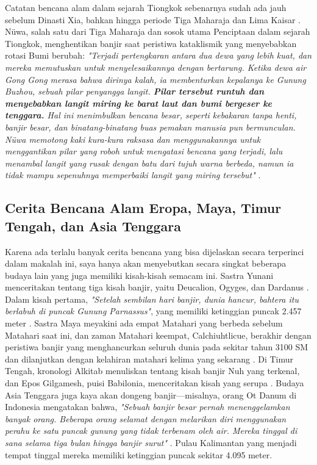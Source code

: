 \documentclass[10pt,twocolumn,letterpaper]{article}
\begin{document}
Catatan bencana alam dalam sejarah Tiongkok sebenarnya sudah ada jauh sebelum Dinasti Xia, bahkan hingga periode Tiga Maharaja dan Lima Kaisar \cite{7}. Nüwa, salah satu dari Tiga Maharaja dan sosok utama Penciptaan dalam sejarah Tiongkok, menghentikan banjir saat peristiwa kataklismik yang menyebabkan rotasi Bumi berubah: \textit{"Terjadi pertengkaran antara dua dewa yang lebih kuat, dan mereka memutuskan untuk menyelesaikannya dengan bertarung. Ketika dewa air Gong Gong merasa bahwa dirinya kalah, ia membenturkan kepalanya ke Gunung Buzhou, sebuah pilar penyangga langit. \textbf{Pilar tersebut runtuh dan menyebabkan langit miring ke barat laut dan bumi bergeser ke tenggara.} Hal ini menimbulkan bencana besar, seperti kebakaran tanpa henti, banjir besar, dan binatang-binatang buas pemakan manusia pun bermunculan. Nüwa memotong kaki kura-kura raksasa dan menggunakannya untuk menggantikan pilar yang roboh untuk mengatasi bencana yang terjadi, lalu menambal langit yang rusak dengan batu dari tujuh warna berbeda, namun ia tidak mampu sepenuhnya memperbaiki langit yang miring tersebut"} \cite{8}.

\subsection{Cerita Bencana Alam Eropa, Maya, Timur Tengah, dan Asia Tenggara}

Karena ada terlalu banyak cerita bencana yang bisa dijelaskan secara terperinci dalam makalah ini, saya hanya akan menyebutkan secara singkat beberapa budaya lain yang juga memiliki kisah-kisah semacam ini. Sastra Yunani menceritakan tentang tiga kisah banjir, yaitu Deucalion, Ogyges, dan Dardanus \cite{9,10}. Dalam kisah pertama, \textit{"Setelah sembilan hari banjir, dunia hancur, bahtera itu berlabuh di puncak Gunung Parnassus"}, yang memiliki ketinggian puncak 2.457 meter \cite{11}. Sastra Maya meyakini ada empat Matahari yang berbeda sebelum Matahari saat ini, dan zaman Matahari keempat, Calchiuhtlicue, berakhir dengan peristiwa banjir yang menghancurkan seluruh dunia pada sekitar tahun 3100 SM dan dilanjutkan dengan kelahiran matahari kelima yang sekarang \cite{12}. Di Timur Tengah, kronologi Alkitab menuliskan tentang kisah banjir Nuh yang terkenal, dan Epos Gilgamesh, puisi Babilonia, menceritakan kisah yang serupa \cite{13}. Budaya Asia Tenggara juga kaya akan dongeng banjir—misalnya, orang Ot Danum di Indonesia mengatakan bahwa, \textit{"Sebuah banjir besar pernah menenggelamkan banyak orang. Beberapa orang selamat dengan melarikan diri menggunakan perahu ke satu puncak gunung yang tidak terbenam oleh air. Mereka tinggal di sana selama tiga bulan hingga banjir surut"} \cite{3}. Pulau Kalimantan yang menjadi tempat tinggal mereka memiliki ketinggian puncak sekitar 4.095 meter.
\end{document}

